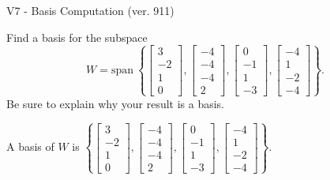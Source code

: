 \begin{exercise}
  \begin{exerciseTitle}V7 - Basis Computation (ver. 911)\end{exerciseTitle}
  \begin{exerciseStatement}
    Find a basis for the subspace 
\[W=\mathrm{span}\ \left\{\left[\begin{array}{r}
3 \\
-2 \\
1 \\
0
\end{array}\right] , \left[\begin{array}{r}
-4 \\
-4 \\
-4 \\
2
\end{array}\right] , \left[\begin{array}{r}
0 \\
-1 \\
1 \\
-3
\end{array}\right] , \left[\begin{array}{r}
-4 \\
1 \\
-2 \\
-4
\end{array}\right]\right\}.\]
 Be sure to explain why your result is a basis.


  \end{exerciseStatement}
  \begin{exerciseAnswer}
   A basis of \(W\) is  \(\left\{\left[\begin{array}{r}
3 \\
-2 \\
1 \\
0
\end{array}\right] , \left[\begin{array}{r}
-4 \\
-4 \\
-4 \\
2
\end{array}\right] , \left[\begin{array}{r}
0 \\
-1 \\
1 \\
-3
\end{array}\right] , \left[\begin{array}{r}
-4 \\
1 \\
-2 \\
-4
\end{array}\right]\right\}\).
  


  \end{exerciseAnswer}
\end{exercise}